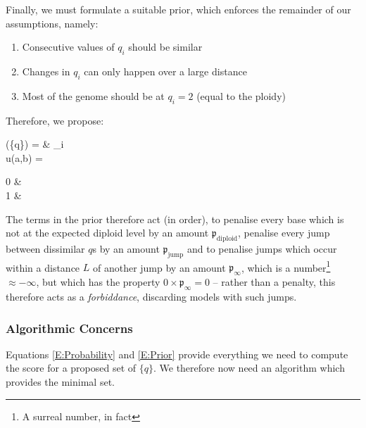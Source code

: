 \documentclass[fleqn,usenatbib]{mnras}
\begin{document}
				Finally, we must formulate a suitable prior, which enforces the remainder of our assumptions, namely:
				\begin{enumerate}
					\item Consecutive values of $q_i$ should be similar
					\item Changes in $q_i$ can only happen over a large distance
					\item Most of the genome should be at $q_i = 2$ (equal to the ploidy)
				\end{enumerate}
				Therefore, we propose:
				\begin{spalign}
					(\{q\})   = & \sum_i \Bigg[  \mathfrak{p}_\text{ploidy} u(q_i,2)  
					\\
					 + & u(q_i,q_{i-1})\left( \mathfrak{p}_\text{jump} +  \mathfrak{p}_\infty \sum_{j = i-L}^{i-1} u(q_j,q_{i-1})  \right)\Bigg]
					 \\
					 u(a,b) = \begin{cases}
						0 & 
						\\
						1 & 
					 \end{cases}\label{E:Prior}
				\end{spalign}
				The terms in the prior therefore act (in order), to penalise every base which is not at the expected diploid level by an amount $\mathfrak{p}_\text{diploid}$, penalise every jump between dissimilar $q$s by an amount $\mathfrak{p}_\text{jump}$ and to penalise jumps which occur within a distance $L$ of another jump by an amount $\mathfrak{p}_\infty$, which is a number\footnote{A surreal number, in fact} $\approx -\infty$, but which has the property $0 \times \mathfrak{p}_\infty = 0$ -- rather than a penalty, this therefore acts as a \textit{forbiddance}, discarding models with such jumps.


			\subsubsection{Algorithmic Concerns}

				Equations \eqref{E:Probability} and \eqref{E:Prior} provide everything we need to compute the score  for a proposed set of $\{q\}$. We therefore now need an algorithm which provides the minimal set.

\end{document}
